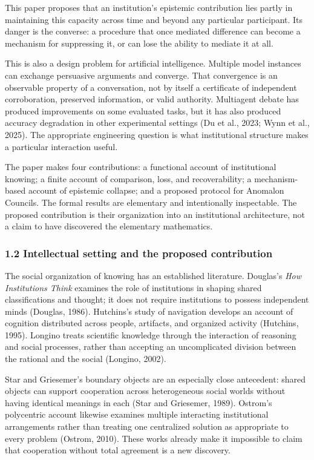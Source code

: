 \documentclass[
  10pt,
]{article}
\begin{document}
This paper proposes that an institution's epistemic contribution lies partly in maintaining this capacity across time and beyond any particular participant. Its danger is the converse: a procedure that once mediated difference can become a mechanism for suppressing it, or can lose the ability to mediate it at all.

This is also a design problem for artificial intelligence. Multiple model instances can exchange persuasive arguments and converge. That convergence is an observable property of a conversation, not by itself a certificate of independent corroboration, preserved information, or valid authority. Multiagent debate has produced improvements on some evaluated tasks, but it has also produced accuracy degradation in other experimental settings (Du et al., 2023; Wynn et al., 2025). The appropriate engineering question is what institutional structure makes a particular interaction useful.

The paper makes four contributions: a functional account of institutional knowing; a finite account of comparison, loss, and recoverability; a mechanism-based account of epistemic collapse; and a proposed protocol for Anomalon Councils. The formal results are elementary and intentionally inspectable. The proposed contribution is their organization into an institutional architecture, not a claim to have discovered the elementary mathematics.

\subsubsection{1.2 Intellectual setting and the proposed contribution}\label{intellectual-setting-and-the-proposed-contribution}

The social organization of knowing has an established literature. Douglas's \emph{How Institutions Think} examines the role of institutions in shaping shared classifications and thought; it does not require institutions to possess independent minds (Douglas, 1986). Hutchins's study of navigation develops an account of cognition distributed across people, artifacts, and organized activity (Hutchins, 1995). Longino treats scientific knowledge through the interaction of reasoning and social processes, rather than accepting an uncomplicated division between the rational and the social (Longino, 2002).

Star and Griesemer's boundary objects are an especially close antecedent: shared objects can support cooperation across heterogeneous social worlds without having identical meanings in each (Star and Griesemer, 1989). Ostrom's polycentric account likewise examines multiple interacting institutional arrangements rather than treating one centralized solution as appropriate to every problem (Ostrom, 2010). These works already make it impossible to claim that cooperation without total agreement is a new discovery.
\end{document}
